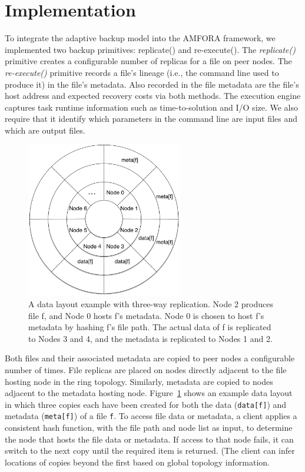 \documentclass{sig-alternate}
\begin{document}
\section{Implementation}
\label{sec:Impl}
To integrate the adaptive backup model into the AMFORA framework, we implemented two backup primitives: replicate() and re-execute(). The {\em replicate()} primitive creates a configurable number of replicas for a file on peer nodes. The {\em re-execute()} primitive records a file's lineage (i.e., the command line used to produce it) in the file's metadata. Also recorded in the file metadata are the file's host address and expected recovery costs via both methods.
The execution engine captures task runtime information such as time-to-solution and I/O size. We also require that it
identify which parameters in the command line are input files and which are output files.

\begin{figure}[ht]
	\begin{center}
		\includegraphics[width=68mm]{pictures/datalayout}
		\caption{A data layout example with three-way replication. Node 2 produces file f, and Node 0 hosts f's
		metadata. Node 0 is chosen to host f's metadata by hashing f's file path. The actual data of f is replicated to Nodes 3 and 4, and the metadata is replicated
		to Nodes 1 and 2.
		\label{fig:datalayout}}
  	\end{center}
\end{figure}

Both files and their associated metadata are copied to peer nodes a configurable number of times.
File replicas are placed on nodes directly adjacent to the file hosting node in the ring topology.
Similarly, metadata are copied to nodes adjacent to the metadata hosting node.
Figure~\ref{fig:datalayout} shows an example data layout in which three copies each have been
created for both the data ({\tt data[f]}) and metadata ({\tt meta[f]}) of a file {\tt f}.
To access file data or metadata, a client applies a consistent hash function, with the file path and node list as input, to determine the node that hosts the file data or metadata. If access to that node fails, it can switch to the next copy until the required item is returned. (The client can infer locations of copies beyond the first based on global topology information.
\end{document}
